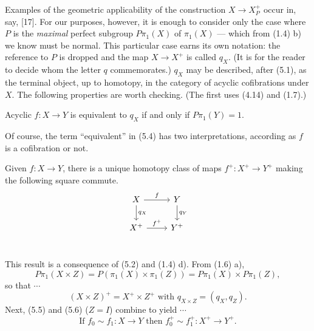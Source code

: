 Examples of the geometric applicability of the construction $X\longrightarrow X_P^+$ occur in, say, [17]. For our purposes, however, it is enough to consider only the case where $P$ is the {\em maximal} perfect subgroup $P\pi_1(X)$ of $\pi_1(X)$ --- which from (1.4) b) we know must be normal. This particular case earns its own notation: the reference to $P$ is dropped and the map $X \longrightarrow X^+$ is called $q_X$. (It is for the reader to decide whom the letter $q$ commemorates.) $q_X$ may be described, after (5.1), as the terminal object, up to homotopy, in the category of acyclic cofibrations under $X$. The following properties are worth checking. (The first uses (4.14) and (1.7).)
\begin{prop}
	Acyclic $f\colon   X \longrightarrow Y$ is equivalent to $q_X$ if and only if $P\pi_1(Y) = 1$.
\end{prop}
Of course, the term ``equivalent'' in (5.4) has two interpretations, according as $f$ is a cofibration or not.
\begin{prop}
	Given $f \colon   X \longrightarrow Y$, there is a unique homotopy class of maps $f^+ \colon  X^+ \longrightarrow Y^+$ making the following square commute.
\[
 \begin{tikzcd}
 X \arrow{d}{q_X} \arrow{r}{f}  & Y \arrow{d}{q_Y}\\
 X^+ \arrow{r}{f^+} & Y^+\\
 \end{tikzcd}
 \]
\end{prop}
This result is a consequence of (5.2) and (1.4) d). From (1.6) a),
\[P\pi_1(X\times Z)=P(\pi_1(X)\times \pi_1(Z))=P\pi_1(X)\times P\pi_1(Z), \]
so that $\cdots$
\begin{equation}
	(X\times Z)^+ = X^+ \times Z^+ \mbox{ with } q_{X\times Z} = (q_X, q_Z).
\end{equation}
Next, (5.5) and (5.6) ($Z = I$) combine to yield $\cdots$
\begin{equation}
 	\mbox{If } f_0 \sim f_1 \colon  X\longrightarrow Y \mbox{ then }f_0^+ \sim f_1^+ \colon  X^+ \longrightarrow Y^+.
 \end{equation} 

